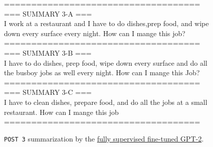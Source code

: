\documentclass{article}
\begin{document}
\begin{figure*}[h!]
    \centering
    \begin{tcolorbox}[colframe=black!10!white, colback=black!5!white]
        \begin{minipage}{\textwidth}
            \ttfamily
            ====================================\\
            === SUMMARY 3-A ===\\
             I work at a restaurant and I have to do dishes,prep food, and wipe down every surface every night. How can I mange this job? \\

            ====================================\\
            === SUMMARY 3-B ===\\
             I have to do dishes, prep food, wipe down every surface and do all the busboy jobs as well every night. How can I mange this Job?\\              

            ====================================\\
            === SUMMARY 3-C ===\\
             I have to clean dishes, prepare food, and do all the jobs at a small restaurant. How can I mange this job \\                                       
            ====================================   
        \end{minipage}
    \end{tcolorbox}
    \caption{\texttt{POST 3} summarization by the \href{https://huggingface.co/course-genai-w24/week4-gpt2-sft-tldr}{fully supervised fine-tuned GPT-2}.}
    \label{I7:sft-gpt-2-example}
\end{figure*}
\end{document}
